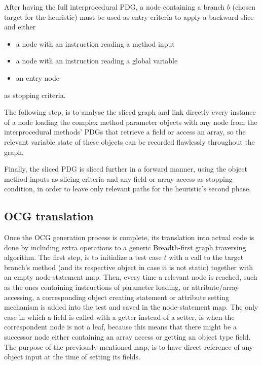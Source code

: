 \documentclass[%
  chapterprefix=false,%
  open=right,%
  twoside=true,%
  paper=a4,%
  logofile={Figures/logo.png},%
  thesistype=master,%
  UKenglish,%
]{se2thesis}
\begin{document}
After having the full interprocedural PDG, a node containing a branch \(b\) (chosen target for the heuristic) must be used as entry criteria to apply a backward slice and either

\begin{itemize}
  \item a node with an instruction reading a method input
  \item a node with an instruction reading a global variable
  \item an entry node 
\end{itemize}

as stopping criteria.

The following step, is to analyse the sliced graph and link directly every instance of a node loading the complex method parameter objects with any node from the interprocedural methods' PDGs that retrieve a field or access an array, so the relevant variable state of these objects can be recorded flawlessly throughout the graph.

Finally, the sliced PDG is sliced further in a forward manner, using the object method inputs as slicing criteria and any field or array access as stopping condition, in order to leave only relevant paths for the heuristic's second phase.

\subsection{OCG translation}

Once the OCG generation process is complete, its translation into actual code is done by including extra operations to a generic Breadth-first graph traversing algorithm.
The first step, is to initialize a test case \(t\) with a call to the target branch's method (and its respective object in case it is not static) together with an empty node-statement map.
Then, every time a relevant node is reached, such as the ones containing instructions of parameter loading, or attribute/array accessing, a corresponding object creating statement or attribute setting mechanism is added into the test and saved in the node-statement map.
The only case in which a field is called with a getter instead of a setter, is when the correspondent node is not a leaf, because this means that there might be a successor node either containing an array access or getting an object type field.
The purpose of the previously mentioned map, is to have direct reference of any object input at the time of setting its fields.
\end{document}
